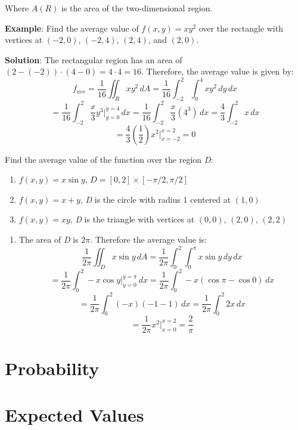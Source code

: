 Where $A(R)$ is the area of the two-dimensional region. 

\textbf{Example}: Find the average value of $f(x, y) = xy^2$ over the rectangle
with vertices at $(-2, 0)$, $(-2, 4)$, $(2, 4)$, and $(2, 0)$. 

\textbf{Solution}: The rectangular region has an area of $(2 - (-2)) \cdot (4 -
0) = 4 \cdot 4 = 16$. Therefore, the average value is given by:
$$f_{ave} = \frac{1}{16} \iint_{R} xy^2\,dA = \frac{1}{16} \int_{-2}^2 \int_0^4
xy^2\,dy\,dx$$
$$= \frac{1}{16} \int_{-2}^2 \frac{x}{3} y^3|_{y = 0}^{y = 4}\,dx = \frac{1}{
16} \int_{-2}^2 \frac{x}{3} \left(4^3 \right)\,dx = \frac{4}{3} \int_{-2}^2 x\,
dx$$
$$= \frac{4}{3} \left( \frac{1}{2} \right) x^2|_{x = -2}^{x = 2} = 0$$

\begin{Exercise}[title = {Average Value}, label = avg]
Find the average value of the function over the region \textit{D}:
\begin{enumerate}
\item $f(x, y) = x\sin{y}$, $\textit{D} = [0, 2] \times [-\pi/2, \pi/2]$
\item $f(x, y) = x + y$, \textit{D} is the circle with radius 1 centered at 
$(1, 0)$
\item $f(x, y) = xy$, \textit{D} is the triangle with vertices at $(0, 0)$, 
$(2, 0)$, $(2, 2)$
\end{enumerate}
\vspace{70mm}
\end{Exercise}

\begin{Answer}[ref = avg]
\begin{enumerate}
\item The area of \textit{D} is $2\pi$. Therefore the average value is:
$$\frac{1}{2\pi} \iint_{\textit{D}} x\sin{y}\,dA = \frac{1}{2\pi} \int_0^2 
\int_{0}^{\pi} x\sin{y}\,dy\,dx$$
$$= \frac{1}{2\pi} \int_0^2 -x\cos{y}|_{y = 0}^{y = \pi}\,dx = \frac{1}{2\pi} 
\int_0^2 -x \left( \cos{\pi} - \cos{0} \right)\,dx$$
$$= \frac{1}{2\pi} \int_0^2 (-x)(-1 - 1)\,dx = \frac{1}{2\pi} \int_0^2 2x\,dx$$
$$= \frac{1}{2\pi} x^2|_{x = 0}^{x = 2} = \frac{2}{\pi}$$
\end{enumerate}
\end{Answer}

\section{Probability}

\section{Expected Values}
